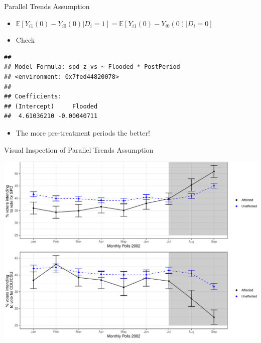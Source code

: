\documentclass[ignorenonframetext,]{beamer}
\newenvironment{Shaded}{\begin{snugshade}}{\end{snugshade}}
\newcommand{\KeywordTok}[1]{\textcolor[rgb]{0.13,0.29,0.53}{\textbf{#1}}}
\newcommand{\DataTypeTok}[1]{\textcolor[rgb]{0.13,0.29,0.53}{#1}}
\newcommand{\StringTok}[1]{\textcolor[rgb]{0.31,0.60,0.02}{#1}}
\newcommand{\OperatorTok}[1]{\textcolor[rgb]{0.81,0.36,0.00}{\textbf{#1}}}
\newcommand{\NormalTok}[1]{#1}
\providecommand{\tightlist}{%
  \setlength{\itemsep}{0pt}\setlength{\parskip}{0pt}}
\begin{document}
\begin{frame}[fragile]{Parallel Trends Assumption}

\begin{itemize}[<+->]
\item
  \(\mathbb{E}[Y_{i1}(0) - Y_{i0}(0)| D_i = 1] = \mathbb{E}[Y_{i1}(0) - Y_{i0}(0)| D_i = 0]\)
\item
  Check \color{blue}{leads}\color{black}{: 1994 - 1998}
\end{itemize}

\begin{Shaded}
\end{Shaded}

\begin{verbatim}
## 
## Model Formula: spd_z_vs ~ Flooded * PostPeriod
## <environment: 0x7fed44820078>
## 
## Coefficients:
## (Intercept)     Flooded 
##  4.61036210 -0.00040711
\end{verbatim}

\begin{itemize}[<+->]
\tightlist
\item
  The more pre-treatment periods the better!
\end{itemize}

\end{frame}

\begin{frame}{Visual Inspection of Parallel Trends Assumption}

\begin{center}\includegraphics[width=0.8\linewidth]{Diff_in_diff_FEs_files/figure-beamer/unnamed-chunk-16-1} \end{center}

\end{frame}
\end{document}
